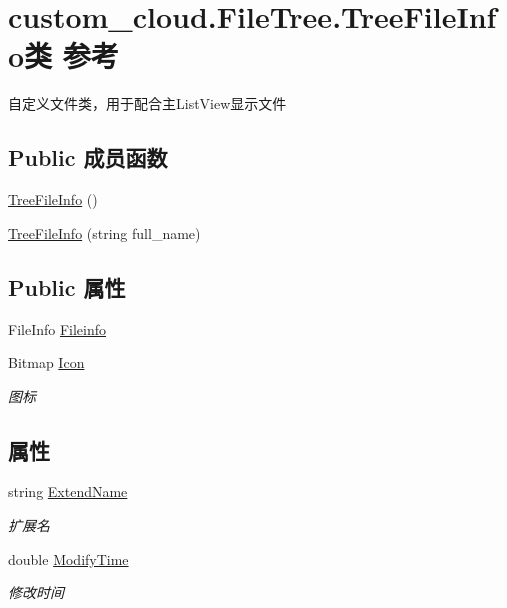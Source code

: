 \hypertarget{classcustom__cloud_1_1_file_tree_1_1_tree_file_info}{}\section{custom\+\_\+cloud.\+File\+Tree.\+Tree\+File\+Info类 参考}
\label{classcustom__cloud_1_1_file_tree_1_1_tree_file_info}


自定义文件类，用于配合主\+List\+View显示文件  


\subsection*{Public 成员函数}
\begin{DoxyCompactItemize}
\item 
\hyperlink{classcustom__cloud_1_1_file_tree_1_1_tree_file_info_ab745f2d5f244dd99df008dd3ef3b7322}{Tree\+File\+Info} ()
\item 
\hyperlink{classcustom__cloud_1_1_file_tree_1_1_tree_file_info_a4b3929267f02db94fdc361f14c023d7f}{Tree\+File\+Info} (string full\+\_\+name)
\end{DoxyCompactItemize}
\subsection*{Public 属性}
\begin{DoxyCompactItemize}
\item 
File\+Info \hyperlink{classcustom__cloud_1_1_file_tree_1_1_tree_file_info_aaccc160373508673bc22f323fd867498}{Fileinfo}
\item 
Bitmap \hyperlink{classcustom__cloud_1_1_file_tree_1_1_tree_file_info_a11c916f170d735b291918dd37492be44}{Icon}
\begin{DoxyCompactList}\small\item\em 图标 \end{DoxyCompactList}\end{DoxyCompactItemize}
\subsection*{属性}
\begin{DoxyCompactItemize}
\item 
string \hyperlink{classcustom__cloud_1_1_file_tree_1_1_tree_file_info_a77490e8860f4419c99b3420952a11bf0}{Extend\+Name}
\begin{DoxyCompactList}\small\item\em 扩展名 \end{DoxyCompactList}\item 
double \hyperlink{classcustom__cloud_1_1_file_tree_1_1_tree_file_info_a087423420ceeb122fb08d6070a1745b2}{Modify\+Time}
\begin{DoxyCompactList}\small\item\em 修改时间 \end{DoxyCompactList}\end{DoxyCompactItemize}


